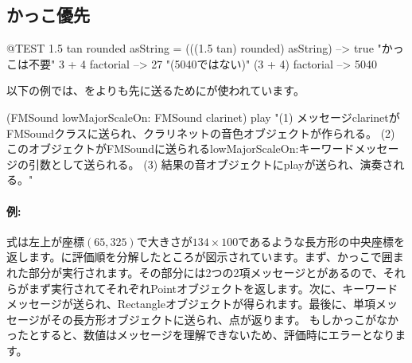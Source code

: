 \documentclass[a4paper,10pt,twoside]{book}
\begin{document}
\subsection{かっこ優先}


\begin{code}{@TEST}
1.5 tan rounded asString = (((1.5 tan) rounded) asString) --> true    "かっこは不要"
3 + 4 factorial   --> 27    "(5040ではない)"
(3 + 4) factorial --> 5040
\end{code}

以下の例では、をよりも先に送るためにが使われています。
\begin{code}{}
(FMSound lowMajorScaleOn: FMSound clarinet) play 
"(1) メッセージclarinetがFMSoundクラスに送られ、クラリネットの音色オブジェクトが作られる。
 (2) このオブジェクトがFMSoundに送られるlowMajorScaleOn:キーワードメッセージの引数として送られる。
 (3) 結果の音オブジェクトにplayが送られ、演奏される。"
\end{code}



\paragraph{例:}
式は左上が座標$(65, 325)$で大きさが$134{\times}100$であるような長方形の中央座標を返します。に評価順を分解したところが図示されています。まず、かっこで囲まれた部分が実行されます。その部分には2つの2項メッセージとがあるので、それらがまず実行されてそれぞれPointオブジェクトを返します。次に、キーワードメッセージが送られ、Rectangleオブジェクトが得られます。最後に、単項メッセージがその長方形オブジェクトに送られ、点が返ります。
もしかっこがなかったとすると、数値はメッセージを理解できないため、評価時にエラーとなります。
\end{document}
